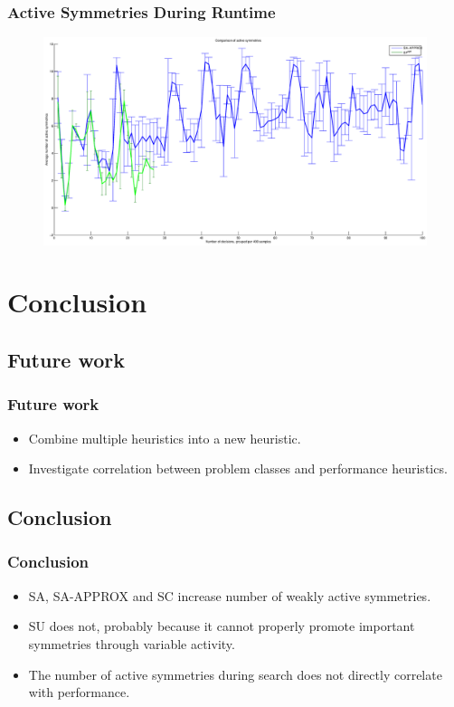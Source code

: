 \documentclass{beamer}
\begin{document}
	\begin{frame}[plain]
		\frametitle{Active Symmetries During Runtime}
		\begin{figure}
			\centerline{\includegraphics[width=1.4\textwidth]{../results/battleship-12-23-approx-vs-reg.eps}}
			\label{fig:active_symmetries_during_search}
		\end{figure}
	\end{frame}
	
	
\section{Conclusion}

	\subsection{Future work}
	\begin{frame}
		\frametitle{Future work}
		
		\begin{itemize}
			\item Combine multiple heuristics into a new heuristic.
			\item Investigate correlation between problem classes and performance heuristics.
		\end{itemize}
	\end{frame}

	\subsection{Conclusion}
	\begin{frame}
		\frametitle{Conclusion}

		\begin{itemize}
			\item SA, SA-APPROX and SC increase number of weakly active symmetries.
			\item SU does not, probably because it cannot properly promote important 
			symmetries through variable activity.
			\item The number of active symmetries during search does not directly 
			correlate with performance.
		\end{itemize}
		
	\end{frame}
\end{document}
